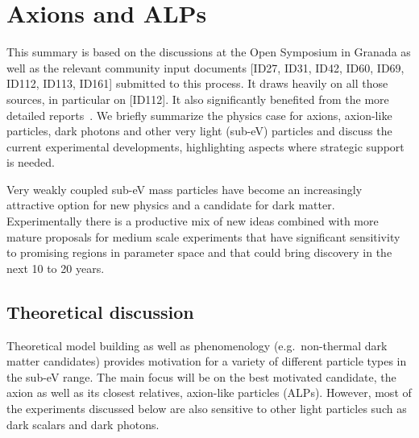 \documentclass[../report.tex]{subfiles}
\begin{document}
\section{Axions and ALPs}
This summary is based on the discussions at the Open Symposium in Granada as well as the relevant community input documents [ID27, ID31, ID42, ID60, ID69, ID112, ID113, ID161] submitted to this process. 
It draws heavily on all those sources, in particular on [ID112]. It also significantly benefited from the more detailed reports~\cite{Alemany:2019vsk,Beacham:2019nyx,Siemko:2652165}.
We briefly summarize the physics case for axions, axion-like particles, dark photons and other very light (sub-eV) particles and discuss the current experimental developments, highlighting aspects where strategic support is needed.

Very weakly coupled sub-eV mass particles have become an increasingly attractive option for new physics and a candidate for dark matter.
Experimentally there is a productive mix of new ideas combined with more mature proposals for medium scale experiments that have significant sensitivity to promising regions in parameter space and that could bring discovery in the next 10 to 20 years.


\subsection{Theoretical discussion}
Theoretical model building as well as phenomenology (e.g.\ non-thermal dark matter candidates) provides motivation for a variety of different particle types in the sub-eV range. 
The main focus will be on the best motivated candidate, the axion as well as its closest relatives, axion-like particles (ALPs). However, most of the experiments discussed below are also sensitive to other light particles such as dark scalars and dark photons.
\end{document}
